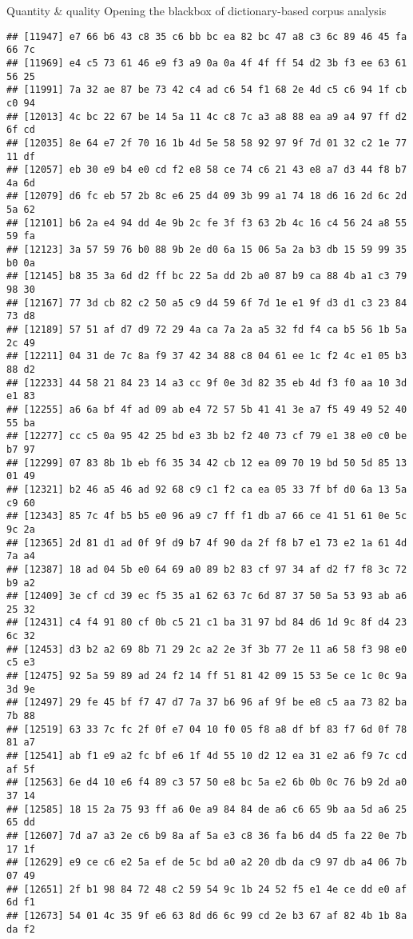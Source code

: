 \documentclass[
  ignorenonframetext,
]{beamer}
\begin{document}
\begin{frame}[fragile]{Quantity \& quality \textbar{} Opening the
blackbox of dictionary-based corpus analysis}
\begin{verbatim}
## [11947] e7 66 b6 43 c8 35 c6 bb bc ea 82 bc 47 a8 c3 6c 89 46 45 fa 66 7c
## [11969] e4 c5 73 61 46 e9 f3 a9 0a 0a 4f 4f ff 54 d2 3b f3 ee 63 61 56 25
## [11991] 7a 32 ae 87 be 73 42 c4 ad c6 54 f1 68 2e 4d c5 c6 94 1f cb c0 94
## [12013] 4c bc 22 67 be 14 5a 11 4c c8 7c a3 a8 88 ea a9 a4 97 ff d2 6f cd
## [12035] 8e 64 e7 2f 70 16 1b 4d 5e 58 58 92 97 9f 7d 01 32 c2 1e 77 11 df
## [12057] eb 30 e9 b4 e0 cd f2 e8 58 ce 74 c6 21 43 e8 a7 d3 44 f8 b7 4a 6d
## [12079] d6 fc eb 57 2b 8c e6 25 d4 09 3b 99 a1 74 18 d6 16 2d 6c 2d 5a 62
## [12101] b6 2a e4 94 dd 4e 9b 2c fe 3f f3 63 2b 4c 16 c4 56 24 a8 55 59 fa
## [12123] 3a 57 59 76 b0 88 9b 2e d0 6a 15 06 5a 2a b3 db 15 59 99 35 b0 0a
## [12145] b8 35 3a 6d d2 ff bc 22 5a dd 2b a0 87 b9 ca 88 4b a1 c3 79 98 30
## [12167] 77 3d cb 82 c2 50 a5 c9 d4 59 6f 7d 1e e1 9f d3 d1 c3 23 84 73 d8
## [12189] 57 51 af d7 d9 72 29 4a ca 7a 2a a5 32 fd f4 ca b5 56 1b 5a 2c 49
## [12211] 04 31 de 7c 8a f9 37 42 34 88 c8 04 61 ee 1c f2 4c e1 05 b3 88 d2
## [12233] 44 58 21 84 23 14 a3 cc 9f 0e 3d 82 35 eb 4d f3 f0 aa 10 3d e1 83
## [12255] a6 6a bf 4f ad 09 ab e4 72 57 5b 41 41 3e a7 f5 49 49 52 40 55 ba
## [12277] cc c5 0a 95 42 25 bd e3 3b b2 f2 40 73 cf 79 e1 38 e0 c0 be b7 97
## [12299] 07 83 8b 1b eb f6 35 34 42 cb 12 ea 09 70 19 bd 50 5d 85 13 01 49
## [12321] b2 46 a5 46 ad 92 68 c9 c1 f2 ca ea 05 33 7f bf d0 6a 13 5a c9 60
## [12343] 85 7c 4f b5 b5 e0 96 a9 c7 ff f1 db a7 66 ce 41 51 61 0e 5c 9c 2a
## [12365] 2d 81 d1 ad 0f 9f d9 b7 4f 90 da 2f f8 b7 e1 73 e2 1a 61 4d 7a a4
## [12387] 18 ad 04 5b e0 64 69 a0 89 b2 83 cf 97 34 af d2 f7 f8 3c 72 b9 a2
## [12409] 3e cf cd 39 ec f5 35 a1 62 63 7c 6d 87 37 50 5a 53 93 ab a6 25 32
## [12431] c4 f4 91 80 cf 0b c5 21 c1 ba 31 97 bd 84 d6 1d 9c 8f d4 23 6c 32
## [12453] d3 b2 a2 69 8b 71 29 2c a2 2e 3f 3b 77 2e 11 a6 58 f3 98 e0 c5 e3
## [12475] 92 5a 59 89 ad 24 f2 14 ff 51 81 42 09 15 53 5e ce 1c 0c 9a 3d 9e
## [12497] 29 fe 45 bf f7 47 d7 7a 37 b6 96 af 9f be e8 c5 aa 73 82 ba 7b 88
## [12519] 63 33 7c fc 2f 0f e7 04 10 f0 05 f8 a8 df bf 83 f7 6d 0f 78 81 a7
## [12541] ab f1 e9 a2 fc bf e6 1f 4d 55 10 d2 12 ea 31 e2 a6 f9 7c cd af 5f
## [12563] 6e d4 10 e6 f4 89 c3 57 50 e8 bc 5a e2 6b 0b 0c 76 b9 2d a0 37 14
## [12585] 18 15 2a 75 93 ff a6 0e a9 84 84 de a6 c6 65 9b aa 5d a6 25 65 dd
## [12607] 7d a7 a3 2e c6 b9 8a af 5a e3 c8 36 fa b6 d4 d5 fa 22 0e 7b 17 1f
## [12629] e9 ce c6 e2 5a ef de 5c bd a0 a2 20 db da c9 97 db a4 06 7b 07 49
## [12651] 2f b1 98 84 72 48 c2 59 54 9c 1b 24 52 f5 e1 4e ce dd e0 af 6d f1
## [12673] 54 01 4c 35 9f e6 63 8d d6 6c 99 cd 2e b3 67 af 82 4b 1b 8a da f2

\end{verbatim}
\end{frame}
\end{document}
